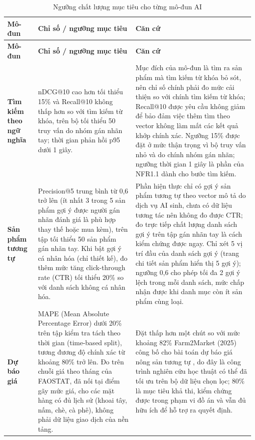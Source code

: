 \begingroup
\tblsetup\tblzebra
\begin{longtable}{L{2.48cm} L{5.98cm} L{6.44cm}}
\caption{Ngưỡng chất lượng mục tiêu cho từng mô-đun AI}
\label{tab:nguongAI} \\
\toprule
{}
\textbf{Mô-đun} & \textbf{Chỉ số / ngưỡng mục tiêu} & \textbf{Căn cứ} \\
\midrule
\endfirsthead
\toprule
{}
\textbf{Mô-đun} & \textbf{Chỉ số / ngưỡng mục tiêu} & \textbf{Căn cứ} \\
\midrule
\endhead
\bottomrule
\endfoot
\textbf{Tìm kiếm theo ngữ nghĩa} &
nDCG@10 cao hơn tối thiểu 15\% và Recall@10 không thấp hơn so với tìm kiếm từ khóa, trên bộ tối thiểu 50 truy vấn do nhóm gán nhãn tay; thời gian phản hồi p95 dưới 1 giây. &
Mục đích của mô-đun là tìm ra sản phẩm mà tìm kiếm từ khóa bỏ sót, nên chỉ số chính phải đo mức cải thiện so với chính tìm kiếm từ khóa; Recall@10 được yêu cầu không giảm để bảo đảm việc thêm tìm theo vector không làm mất các kết quả khớp chính xác. Ngưỡng 15\% được đặt ở mức thận trọng vì bộ truy vấn nhỏ và do chính nhóm gán nhãn; ngưỡng thời gian 1 giây là phần của NFR1.1 dành cho bước tìm kiếm. \\
\textbf{Sản phẩm tương tự} &
Precision@5 trung bình từ 0,6 trở lên (ít nhất 3 trong 5 sản phẩm gợi ý được người gán nhãn đánh giá là phù hợp thay thế hoặc mua kèm), trên tập tối thiểu 50 sản phẩm gán nhãn tay. Khi bật gợi ý cá nhân hóa (chỉ thiết kế), đo thêm mức tăng click-through rate (CTR) tối thiểu 20\% so với danh sách không cá nhân hóa. &
Phần hiện thực chỉ có gợi ý sản phẩm tương tự theo vector mô tả do dịch vụ AI sinh, chưa có dữ liệu tương tác nên không đo được CTR; đo trực tiếp chất lượng danh sách gợi ý trên tập gán nhãn tay là cách kiểm chứng được ngay. Chỉ xét 5 vị trí đầu của danh sách gợi ý (trang chi tiết sản phẩm hiển thị 5 gợi ý); ngưỡng 0,6 cho phép tối đa 2 gợi ý lệch trong mỗi danh sách, mức chấp nhận được khi danh mục còn ít sản phẩm cùng loại. \\
\textbf{Dự báo giá} &
MAPE (Mean Absolute Percentage Error) dưới 20\% trên tập kiểm tra tách theo thời gian (time-based split), tương đương độ chính xác từ khoảng 80\% trở lên. Đo trên chuỗi giá theo tháng của FAOSTAT, đã nối tại điểm gãy mức giá, cho các mặt hàng có đủ lịch sử (khoai tây, nấm, chè, cà phê), không phải dữ liệu giao dịch của nền tảng. &
Đặt thấp hơn một chút so với mức khoảng 82\% Farm2Market (2025) công bố cho bài toán dự báo giá nông sản tương tự \parencite{farm2market_2025}, do đây là công trình nghiên cứu học thuật có thể đã tối ưu trên bộ dữ liệu chọn lọc; 80\% là mục tiêu khả thi, kiểm chứng được trong phạm vi đồ án và vẫn đủ hữu ích để hỗ trợ ra quyết định. \\
\end{longtable}
\endgroup

